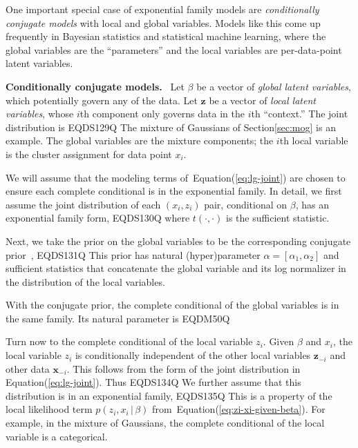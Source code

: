 \documentclass{article}
\DeclareRobustCommand{\parhead}[1]{\textbf{#1}~}
\begin{document}
One important special case of exponential family models are
\textit{conditionally conjugate models} with local and global
variables. Models like this come up frequently in Bayesian statistics
and statistical machine learning, where the global variables are the
``parameters'' and the local variables are per-data-point latent
variables.

\parhead{Conditionally conjugate models.}  Let $\beta$ be a vector of
\textit{global latent variables}, which potentially govern any of the
data. Let ${\mathbf{z}}$ be a vector of \textit{local latent variables}, whose
$i$th component only governs data in the $i$th ``context.'' The joint
distribution is
EQDS129Q
The mixture of Gaussians of Section\nobreakspace \ref {sec:mog} is an example. The global
variables are the mixture components; the $i$th local variable is the
cluster assignment for data point $x_i$.

We will assume that the modeling terms of~Equation\nobreakspace \textup {(\ref {eq:lg-joint})} are
chosen to ensure each complete conditional is in the exponential
family. In detail, we first assume the joint distribution of each
$(x_i, z_i)$ pair, conditional on $\beta$, has an exponential family
form,
EQDS130Q
where $t(\cdot, \cdot)$ is the sufficient statistic.

Next, we take the prior on the global variables to be the
corresponding conjugate prior~\citep{diaconis1979conjugate,Bernardo:1994},
EQDS131Q
This prior has natural (hyper)parameter
$\alpha = [\alpha_1, \alpha_2]$ and sufficient statistics that
concatenate the global variable and its log normalizer in the
distribution of the local variables.

With the conjugate prior, the complete conditional of the global
variables is in the same family.  Its natural parameter is
EQDM50Q

Turn now to the complete conditional of the local variable
$z_i$. Given $\beta$ and $x_i$, the local variable $z_i$ is
conditionally independent of the other local variables ${\mathbf{z}}_{-i}$ and
other data ${\mathbf{x}}_{-i}$.  This follows from the form of the joint
distribution in Equation\nobreakspace \textup {(\ref {eq:lg-joint})}.  Thus
EQDS134Q
We further assume that this distribution is in an exponential family,
EQDS135Q
This is a property of the local likelihood term $p(z_i, x_i {\,\vert\,} \beta)$
from~Equation\nobreakspace \textup {(\ref {eq:zi-xi-given-beta})}.  For example, in the mixture of
Gaussians, the complete conditional of the local variable is a
categorical.
\end{document}
